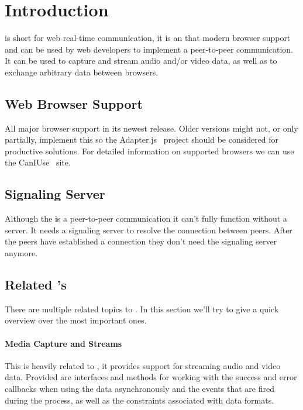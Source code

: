 \clearpage
\chapter{Introduction}
 is short for web real-time communication, it is an  that modern browser support and can be used by web developers to implement a peer-to-peer communication. It can be used to capture and stream audio and/or video data, as well as to exchange arbitrary data between browsers.

\section{Web Browser Support}
All major browser support  in its newest release. Older versions might not, or only partially, implement this  so the Adapter.js~\autocite{adapterjs} project should be considered for productive solutions. For detailed information on supported browsers we can use the CanIUse~\autocite{caniuse} site.

\section{Signaling Server}
Although the  is a peer-to-peer communication  it can't fully function without a server. It needs a signaling server to resolve the connection between peers. After the peers have established a connection they don't need the signaling server anymore.

\section{Related 's}
There are multiple related topics to . In this section we'll try to give a quick overview over the most important ones.

\subsubsection{Media Capture and Streams }
This  is heavily related to , it provides support for streaming audio and video data. Provided are interfaces and methods for working with the success and error callbacks when using the data asynchronously and the events that are fired during the process, as well as the constraints associated with data formats.